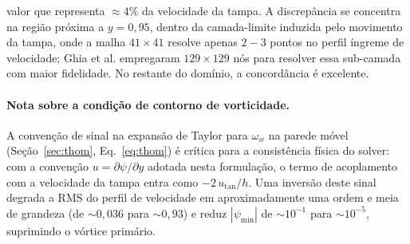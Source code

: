 \noindent valor que representa $\approx 4\%$ da velocidade da tampa. A discrepância se concentra na região próxima a $y = 0{,}95$, dentro da camada-limite induzida pelo movimento da tampa, onde a malha $41 \times 41$ resolve apenas $2{-}3$ pontos no perfil íngreme de velocidade; Ghia et al. empregaram $129 \times 129$ nós para resolver essa sub-camada com maior fidelidade. No restante do domínio, a concordância é excelente.

\paragraph{Nota sobre a condição de contorno de vorticidade.} A convenção de sinal na expansão de Taylor para $\omega_w$ na parede móvel (Seção~\ref{sec:thom}, Eq.~\ref{eq:thom}) é crítica para a consistência física do solver: com a convenção $u = \partial\psi / \partial y$ adotada nesta formulação, o termo de acoplamento com a velocidade da tampa entra como $-2\,u_{\mathrm{tan}}/h$. Uma inversão deste sinal degrada a RMS do perfil de velocidade em aproximadamente uma ordem e meia de grandeza (de $\sim 0{,}036$ para $\sim 0{,}93$) e reduz $|\psi_{\min}|$ de $\sim 10^{-1}$ para $\sim 10^{-5}$, suprimindo o vórtice primário.
